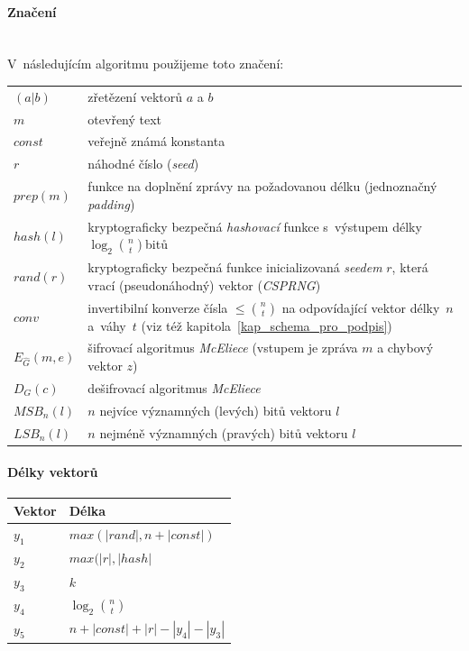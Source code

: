 \documentclass[thesis=M,czech,hidelinks]{FITthesis}[2012/06/26]
\newcommand{\0}{{\textcolor[gray]{0.75}{0}}}
\begin{document}
\paragraph{Značení} \hfil \\
V~následujícím algoritmu použijeme toto značení:
\begin{center}
\begin{tabular}{l p{10cm}}
    $(a|b)$         &   zřetězení vektorů $a$ a $b$ \\
    $m$             &   otevřený text \\
    $const$         &   veřejně známá konstanta \\
    $r$             &   náhodné číslo (\emph{seed}) \\
    $prep(m)$       &   funkce na doplnění zprávy na požadovanou délku
                        (jednoznačný \emph{padding}) \\
    $hash(l)$       &   kryptograficky bezpečná \emph{hashovací} funkce
                        s~výstupem délky $\log_2 \binom{n}{t}$\;bitů \\
    $rand(r)$       &   kryptograficky bezpečná funkce inicializovaná
                        \emph{seedem} $r$, která vrací (pseudonáhodný) vektor
                        (\emph{CSPRNG}) \\
    $conv$          &   invertibilní konverze čísla $\leq \binom{n}{t}$ na
                        odpovídající vektor délky~$n$ a~váhy~$t$ (viz též
                        kapitola~\ref{kap_schema_pro_podpis}) \\
    $E_{\hat{G}}(m,e)$
                    &   šifrovací algoritmus \emph{McEliece} (vstupem je
                        zpráva $m$ a chybový vektor $z$) \\
    $D_G(c)$        &   dešifrovací algoritmus \emph{McEliece} \\
    $MSB_n(l)$      &   $n$ nejvíce významných (levých) bitů vektoru $l$ \\
    $LSB_n(l)$      &   $n$ nejméně významných (pravých) bitů vektoru $l$ \\
\end{tabular}
\end{center}

\paragraph{Délky vektorů}
\begin{center}
\begin{tabular}{l l}
    Vektor      & Délka                                 \\
    \hline
    $y_1$       & $max(|rand|, n+|const|)$              \\
    $y_2$       & $max(|r|,|hash|$                      \\
    $y_3$       & $k$                                   \\
    $y_4$       & $\log_2 \binom{n}{t}$                 \\
    $y_5$       & $n + |const| + |r| - |y_4| - |y_3|$   \\
\end{tabular}
\end{center}
\end{document}

